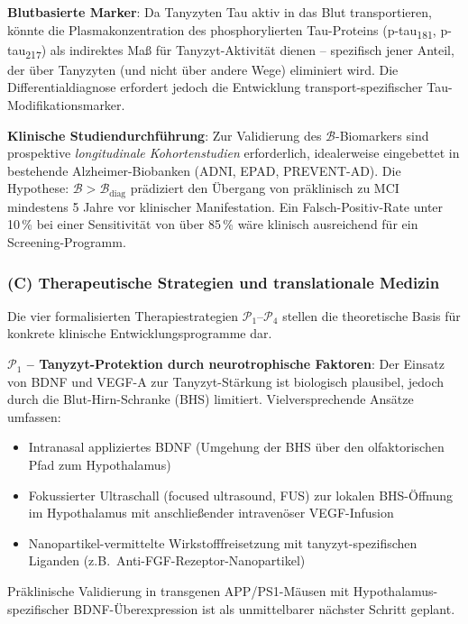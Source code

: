 ﻿\documentclass[12pt,a4paper]{article}
\theoremstyle{definition}
\begin{document}
	\textbf{Blutbasierte Marker}: Da Tanyzyten Tau aktiv in das Blut transportieren, könnte die Plasmakonzentration des phosphorylierten Tau-Proteins (p-tau\textsubscript{181}, p-tau\textsubscript{217}) als indirektes Maß für Tanyzyt-Aktivität dienen -- spezifisch jener Anteil, der über Tanyzyten (und nicht über andere Wege) eliminiert wird. Die Differentialdiagnose erfordert jedoch die Entwicklung transport-spezifischer Tau-Modifikationsmarker.

	\textbf{Klinische Studiendurchführung}: Zur Validierung des $\mathcal{B}$-Biomarkers sind prospektive \emph{longitudinale Kohortenstudien} erforderlich, idealerweise eingebettet in bestehende Alzheimer-Biobanken (ADNI, EPAD, PREVENT-AD). Die Hypothese: $\mathcal{B} > \mathcal{B}_{\text{diag}}$ prädiziert den Übergang von präklinisch zu MCI mindestens 5 Jahre vor klinischer Manifestation. Ein Falsch-Positiv-Rate unter 10\,\% bei einer Sensitivität von über 85\,\% wäre klinisch ausreichend für ein Screening-Programm.

	\subsubsection*{(C) Therapeutische Strategien und translationale Medizin}

	Die vier formalisierten Therapiestrategien $\mathcal{P}_1$--$\mathcal{P}_4$ stellen die theoretische Basis für konkrete klinische Entwicklungsprogramme dar.

	\textbf{$\mathcal{P}_1$ -- Tanyzyt-Protektion durch neurotrophische Faktoren}: Der Einsatz von BDNF und VEGF-A zur Tanyzyt-Stärkung ist biologisch plausibel, jedoch durch die Blut-Hirn-Schranke (BHS) limitiert. Vielversprechende Ansätze umfassen:
	\begin{itemize}
		\item Intranasal appliziertes BDNF (Umgehung der BHS über den olfaktorischen Pfad zum Hypothalamus)
		\item Fokussierter Ultraschall (focused ultrasound, FUS) zur lokalen BHS-Öffnung im Hypothalamus mit anschließender intravenöser VEGF-Infusion
		\item Nanopartikel-vermittelte Wirkstofffreisetzung mit tanyzyt-spezifischen Liganden (z.B.\ Anti-FGF-Rezeptor-Nanopartikel)
	\end{itemize}
	Präklinische Validierung in transgenen APP/PS1-Mäusen mit Hypothalamus-spezifischer BDNF-Überexpression ist als unmittelbarer nächster Schritt geplant.
\end{document}
